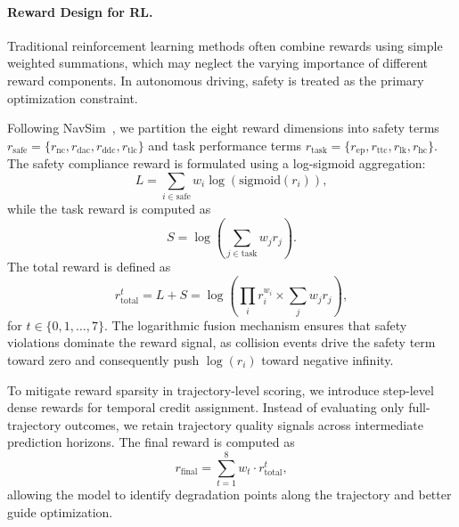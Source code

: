 \documentclass[runningheads]{llncs}
\begin{document}
\paragraph{\textbf{Reward Design for RL.}}
Traditional reinforcement learning methods often combine rewards using simple weighted summations, which may neglect the varying importance of different reward components. In autonomous driving, safety is treated as the primary optimization constraint.

Following NavSim~\cite{im2024navsim}, we partition the eight reward dimensions into safety terms $r_{\text{safe}}=\{r_{\text{nc}},r_{\text{dac}},r_{\text{ddc}},r_{\text{tlc}}\}$ and task performance terms $r_{\text{task}}=\{r_{\text{ep}},r_{\text{ttc}},r_{\text{lk}},r_{\text{hc}}\}$. The safety compliance reward is formulated using a log-sigmoid aggregation:
\begin{equation}
L=\sum_{i\in \text{safe}} w_i \log(\text{sigmoid}(r_i)),
\end{equation}
while the task reward is computed as
\begin{equation}
S=\log\left(\sum_{j\in \text{task}} w_j r_j\right).
\end{equation}
The total reward is defined as
\begin{equation}
r_{\text{total}}^t=L+S=\log\left(\prod_i r_i^{w_i}\times \sum_{j} w_j r_j\right),
\end{equation}
for $t\in\{0,1,\dots,7\}$. The logarithmic fusion mechanism ensures that safety violations dominate the reward signal, as collision events drive the safety term toward zero and consequently push $\log(r_i)$ toward negative infinity.

To mitigate reward sparsity in trajectory-level scoring, we introduce step-level dense rewards for temporal credit assignment. Instead of evaluating only full-trajectory outcomes, we retain trajectory quality signals across intermediate prediction horizons. The final reward is computed as
\begin{equation}
r_{\text{final}}=\sum_{t=1}^{8} w_t \cdot r_{\text{total}}^t,
\end{equation}
allowing the model to identify degradation points along the trajectory and better guide optimization.
\end{document}
